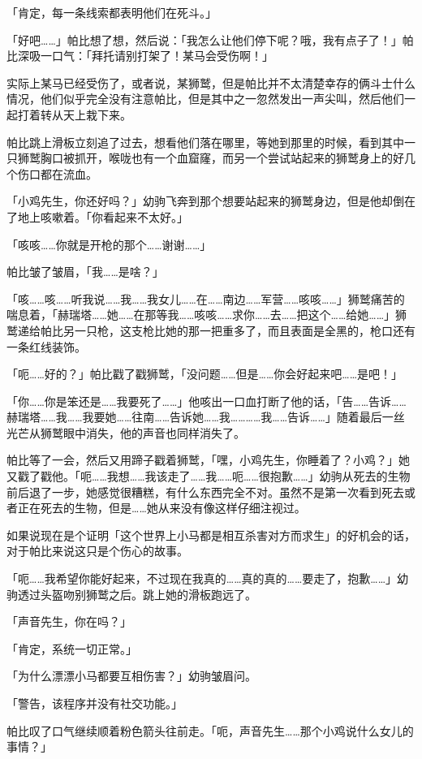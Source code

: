 「{\mtzh 肯定，每一条线索都表明他们在死斗。}」

「好吧……」帕比想了想，然后说：「我怎么让他们停下呢？哦，我有点子了！」帕比深吸一口气：「拜托请别打架了！某马会受伤啊！」

实际上某马已经受伤了，或者说，某狮鹫，但是帕比并不太清楚幸存的俩斗士什么情况，他们似乎完全没有注意帕比，但是其中之一忽然发出一声尖叫，然后他们一起打着转从天上栽下来。

帕比跳上滑板立刻追了过去，想看他们落在哪里，等她到那里的时候，看到其中一只狮鹫胸口被抓开，喉咙也有一个血窟窿，而另一个尝试站起来的狮鹫身上的好几个伤口都在流血。

「小鸡先生，你还好吗？」幼驹飞奔到那个想要站起来的狮鹫身边，但是他却倒在了地上咳嗽着。「你看起来不太好。」

「咳咳……你就是开枪的那个……谢谢……」

帕比皱了皱眉，「我……是啥？」

「咳……咳……听我说……我……我女儿……在……南边……军营……咳咳……」狮鹫痛苦的喘息着，「赫瑞塔……她……在那等我……咳咳……求你……去……把这个……给她……」狮鹫递给帕比另一只枪，这支枪比她的那一把重多了，而且表面是全黑的，枪口还有一条红线装饰。


「呃……好的？」帕比戳了戳狮鹫，「没问题……但是……你会好起来吧……是吧！」

「你……你是笨还是……我要死了……」他咳出一口血打断了他的话，「告……告诉……赫瑞塔……我……我要她……往南……告诉她……我…………我……告诉……」随着最后一丝光芒从狮鹫眼中消失，他的声音也同样消失了。

帕比等了一会，然后又用蹄子戳着狮鹫，「嘿，小鸡先生，你睡着了？小鸡？」她又戳了戳他。「呃……我想……我该走了……我……呃……很抱歉……」幼驹从死去的生物前后退了一步，她感觉很糟糕，有什么东西完全不对。虽然不是第一次看到死去或者正在死去的生物，但是……她从来没有像这样仔细注视过。

如果说现在是个证明「这个世界上小马都是相互杀害对方而求生」的好机会的话，对于帕比来说这只是个伤心的故事。

「呃……我希望你能好起来，不过现在我真的……真的真的……要走了，抱歉……」幼驹透过头盔吻别狮鹫之后。跳上她的滑板跑远了。

「声音先生，你在吗？」

「{\mtzh 肯定，系统一切正常。}」

「为什么漂漂小马都要互相伤害？」幼驹皱眉问。

「{\mtzh 警告，该程序并没有社交功能。}」

帕比叹了口气继续顺着粉色箭头往前走。「呃，声音先生……那个小鸡说什么女儿的事情？」

